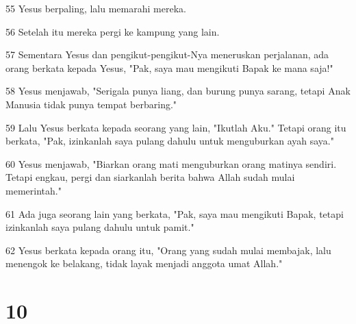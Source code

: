 \par 55 Yesus berpaling, lalu memarahi mereka.
\par 56 Setelah itu mereka pergi ke kampung yang lain.
\par 57 Sementara Yesus dan pengikut-pengikut-Nya meneruskan perjalanan, ada orang berkata kepada Yesus, "Pak, saya mau mengikuti Bapak ke mana saja!"
\par 58 Yesus menjawab, "Serigala punya liang, dan burung punya sarang, tetapi Anak Manusia tidak punya tempat berbaring."
\par 59 Lalu Yesus berkata kepada seorang yang lain, "Ikutlah Aku." Tetapi orang itu berkata, "Pak, izinkanlah saya pulang dahulu untuk menguburkan ayah saya."
\par 60 Yesus menjawab, "Biarkan orang mati menguburkan orang matinya sendiri. Tetapi engkau, pergi dan siarkanlah berita bahwa Allah sudah mulai memerintah."
\par 61 Ada juga seorang lain yang berkata, "Pak, saya mau mengikuti Bapak, tetapi izinkanlah saya pulang dahulu untuk pamit."
\par 62 Yesus berkata kepada orang itu, "Orang yang sudah mulai membajak, lalu menengok ke belakang, tidak layak menjadi anggota umat Allah."

\chapter{10}

